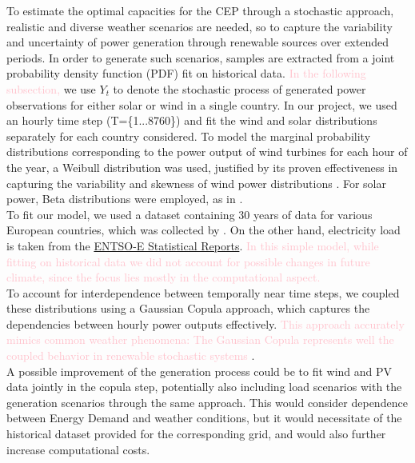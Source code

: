 {To estimate the optimal capacities for the CEP through a stochastic approach, realistic and diverse weather scenarios are needed, so to capture the variability and uncertainty of power generation through renewable sources over extended periods. 
In order to generate such scenarios, samples are extracted from a joint probability density function (PDF) fit on historical data. \textcolor{pink}{In the following subsection,} we use \(Y_t\) to denote the stochastic process of generated power observations for either solar or wind in a single country.
In our project, we used an hourly time step (T=\{1...8760\}) and fit the wind and solar distributions separately for each country considered.
To model the marginal probability distributions corresponding to the power output of wind turbines for each hour of the year, a Weibull distribution was used, justified by its proven effectiveness in capturing the variability and skewness of wind power distributions \textcolor{green}{\cite{weibullwind}}. 
For solar power, Beta distributions were employed, as in \textcolor{green}{\cite{betaPV}}. \\
\indent  To fit our model, we used a dataset containing 30 years of data for various European countries, which was collected by \textcolor{green}{\cite{30y_gen}}. 
On the other hand, electricity load is taken from the \textcolor{green}{\href{https://www.entsoe.eu/data/power-stats/}{ENTSO-E Statistical Reports}}. 
\textcolor{pink}{In this simple model, while fitting on historical data we did not account for possible changes in future climate, since the focus lies mostly in the computational aspect.}\\
To account for interdependence between temporally near time steps, we coupled these distributions using a Gaussian Copula approach, which captures the dependencies between hourly power outputs effectively. \textcolor{pink}{This approach accurately mimics common weather phenomena: The Gaussian Copula represents well the coupled behavior in renewable stochastic systems} \textcolor{green}{\cite{GaussCopula}}. \\
\indent A possible improvement of the generation process could be to fit wind and PV data jointly in the copula step, potentially also including load scenarios with the generation scenarios through the same approach. This would consider dependence between Energy Demand and weather conditions, but it would necessitate of the historical dataset provided for the corresponding grid, and would also further increase computational costs.


}
